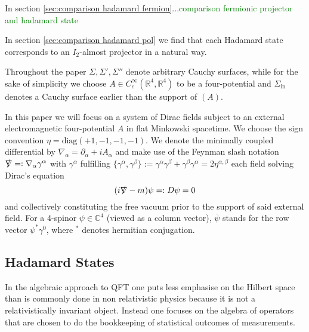 \documentclass[b5paper,draft,openbib,12pt]{memoir}
\begin{document}
In section \ref{sec:comparison hadamard fermion}...\textcolor{green}{comparison fermionic projector and hadamard state}

In section \ref{sec:comparison hadamard pol} we find that each Hadamard state corresponds to an \(I_2\)-almost projector in a natural way.

Throughout the paper
\(\Sigma, \Sigma', \Sigma''\) denote arbitrary Cauchy surfaces, while for the sake of simplicity we choose \(A\in C_c^\infty(\mathbb{R}^4,\mathbb{R}^4)\) 
to be a four-potential and \(\Sigma_{\text{in}}\) denotes a Cauchy surface earlier than the support of \((A)\).

In this paper we will focus on a system of Dirac fields subject to an external electromagnetic four-potential \(A\) in flat Minkowski spacetime.
We choose the sign convention \(\eta=\text{diag}(+1,-1,-1,-1)\). We denote the minimally coupled differential by \(\nabla_{\alpha} = \partial_{\alpha} + i A_{\alpha}\)
and make use of the Feynman slash notation \(\slashed{\nabla}=:\nabla_{\alpha}\gamma^\alpha\) with \(\gamma^\alpha\) fulfilling 
\(\{\gamma^\alpha , \gamma^\beta\}:=\gamma^\alpha  \gamma^\beta+\gamma^\beta  \gamma^\alpha  = 2 \eta^{\alpha,\beta}\)  each field solving 
Dirac's equation
\begin{equation}\label{dirac}
(i\slashed{\nabla}-m)\psi =: D\psi= 0
\end{equation}
and collectively constituting the free vacuum prior to the support of said external field.
For a 4-spinor \(\psi\in\mathbb{C}^4\) (viewed as a column vector), \(\overline{\psi}\) stands for the row vector \(\psi^*\gamma^0\), where \({}^*\) denotes hermitian conjugation.



\subsection{Hadamard States}\label{sec:hadamard}
In the algebraic approach to QFT one puts less emphasise on the Hilbert space than is commonly done in non relativistic physics because 
it is not a relativistically invariant object.
Instead one focuses on the algebra of operators that are chosen to do the bookkeeping of statistical outcomes of measurements. 
\end{document}
